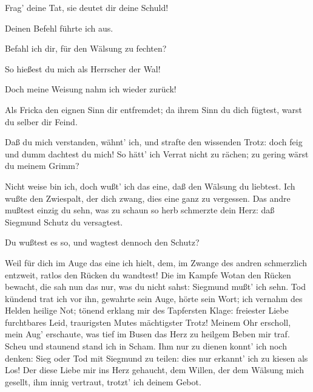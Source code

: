 \begin{drama}
\Wotanspeaks


Frag' deine Tat, sie deutet dir deine Schuld!
 

\Brunnhildespeaks
Deinen Befehl führte ich aus.
 

\Wotanspeaks
Befahl ich dir, für den Wälsung zu fechten?
 

\Brunnhildespeaks
So hießest du mich als Herrscher der Wal!
 

\Wotanspeaks
Doch meine Weisung nahm ich wieder zurück!
 

\Brunnhildespeaks
Als Fricka den eignen Sinn dir entfremdet;
da ihrem Sinn du dich fügtest,
warst du selber dir Feind.
 

\Wotanspeaks


Daß du mich verstanden, wähnt' ich,
und strafte den wissenden Trotz:
doch feig und dumm dachtest du mich!
So hätt' ich Verrat nicht zu rächen;
zu gering wärst du meinem Grimm?
 

\Brunnhildespeaks
Nicht weise bin ich, doch wußt' ich das eine,
daß den Wälsung du liebtest.
Ich wußte den Zwiespalt, der dich zwang,
dies eine ganz zu vergessen.
Das andre mußtest einzig du sehn,
was zu schaun so herb schmerzte dein Herz:
daß Siegmund Schutz du versagtest.
 

\Wotanspeaks
Du wußtest es so, und wagtest dennoch den Schutz?
 

\Brunnhildespeaks


Weil für dich im Auge das eine ich hielt,
dem, im Zwange des andren
schmerzlich entzweit,
ratlos den Rücken du wandtest!
Die im Kampfe Wotan den Rücken bewacht,
die sah nun das nur, was du nicht sahst:
Siegmund mußt' ich sehn.
Tod kündend trat ich vor ihn,
gewahrte sein Auge, hörte sein Wort;
ich vernahm des Helden heilige Not;
tönend erklang mir des Tapfersten Klage:
freiester Liebe furchtbares Leid,
traurigsten Mutes mächtigster Trotz!
Meinem Ohr erscholl, mein Aug' erschaute,
was tief im Busen das Herz
zu heilgem Beben mir traf.
Scheu und staunend stand ich in Scham.
Ihm nur zu dienen konnt' ich noch denken:
Sieg oder Tod mit Siegmund zu teilen:
dies nur erkannt' ich zu kiesen als Los!
Der diese Liebe mir ins Herz gehaucht,
dem Willen, der dem Wälsung mich gesellt,
ihm innig vertraut, trotzt' ich deinem Gebot.
 


\end{drama}

